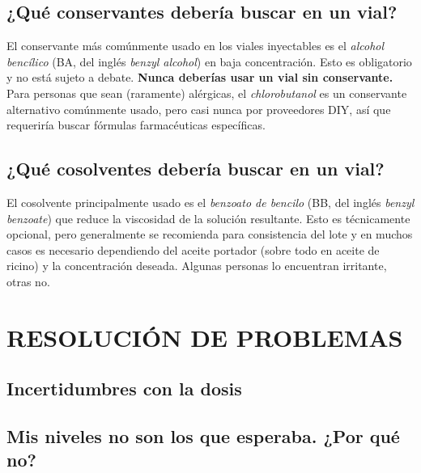 \documentclass{article}
\begin{document}
\subsection{¿Qué conservantes debería buscar en un vial?}\label{6-17}

El conservante más comúnmente usado en los viales inyectables es el \textit{alcohol bencílico} (BA, del inglés \textit{benzyl alcohol}) en baja concentración. Esto es obligatorio y no está sujeto a debate. \textbf{Nunca deberías usar un vial sin conservante.} Para personas que sean (raramente) alérgicas, el \textit{chlorobutanol} es un conservante alternativo comúnmente usado, pero casi nunca por proveedores DIY, así que requeriría buscar fórmulas farmacéuticas específicas.

\subsection{¿Qué cosolventes debería buscar en un vial?}

El cosolvente principalmente usado es el \textit{benzoato de bencilo} (BB, del inglés \textit{benzyl benzoate}) que reduce la viscosidad de la solución resultante. Esto es técnicamente opcional, pero generalmente se recomienda para consistencia del lote y en muchos casos es necesario dependiendo del aceite portador (sobre todo en aceite de ricino) y la concentración deseada. Algunas personas lo encuentran irritante, otras no.



\section{RESOLUCIÓN DE PROBLEMAS}

\subsection*{Incertidumbres con la dosis}

\subsection{Mis niveles no son los que esperaba. ¿Por qué no?}
\end{document}
